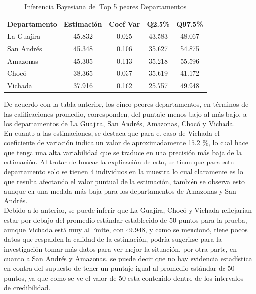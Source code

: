 \documentclass[12pt]{article}
\begin{document}
\begin{table}[H]
\centering
\begin{tabular}{lcccc}
\hline
\textbf{Departamento} & \textbf{Estimación} & \textbf{Coef Var} & \textbf{Q2.5\%} & \textbf{Q97.5\%} \\
\hline
La Guajira & 45.832 & 0.025 & 43.583 & 48.067 \\
San Andrés & 45.348 & 0.106 & 35.627 & 54.875 \\
Amazonas & 45.305 & 0.113 & 35.218 & 55.596 \\
Chocó & 38.365 & 0.037 & 35.619 & 41.172 \\
Vichada & 37.916 & 0.162 & 25.757 & 49.948 \\
\hline
\end{tabular}
\caption{Inferencia Bayesiana del Top 5 peores Departamentos}
\label{tab:peores-departamentos}
\end{table}

De acuerdo con la tabla anterior, los cinco peores departamentos, en términos de las calificaciones promedio, corresponden, del puntaje menos bajo al más bajo, a los departamentos de La Guajira, San Andrés, Amazonas, Chocó y Vichada.\\

En cuanto a las estimaciones, se destaca que para el caso de Vichada el coeficiente de variación indica un valor de aproximadamente 16.2 $\%$, lo cual hace que tenga una alta variabilidad que se traduce en una precisión más baja de la estimación. Al tratar de buscar la explicación de esto, se tiene que para este departamento solo se tienen 4 individuos en la muestra lo cual claramente es lo que resulta afectando el valor puntual de la estimación, también se observa esto aunque en una medida más baja para los departamentos de Amazonas y San Andrés.\\

Debido a lo anterior, se puede inferir que La Guajira, Chocó y Vichada reflejarían estar por debajo del promedio estándar establecido de 50 puntos para la prueba, aunque Vichada está muy al límite, con 49.948, y como se mencionó, tiene pocos datos que respalden la calidad de la estimación, podría sugerirse para la investigación tomar más datos para ver mejor la situación, por otra parte, en cuanto a San Andrés y Amazonas, se puede decir que no hay evidencia estadística en contra del supuesto de tener un puntaje igual al promedio estándar de 50 puntos, ya que como se ve el valor de 50 esta contenido dentro de los intervalos de credibilidad.\\
\end{document}

